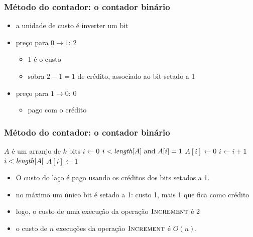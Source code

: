 \documentclass{beamer}
\begin{document}
\begin{frame}

\frametitle{Método do contador: o contador binário}

\begin{itemize}

  \item a unidade de custo é inverter um bit

  \item preço para $0 \rightarrow 1$: 2
   
  \begin{itemize}

    \item 1 é o custo

    \item sobra $2 - 1 = 1$ de crédito, associado ao bit setado a 1

  \end{itemize}

  \item preço para $1 \rightarrow 0$: 0

    \begin{itemize}

      \item pago com o crédito

    \end{itemize}
  
\end{itemize}

\end{frame}

\begin{frame}

\frametitle{Método do contador: o contador binário}

  \begin{codebox}
    \zi \Comment $A$ é um arranjo de $k$ bits
    \li $i \gets 0$
    \li \While $i < \id{length}[A] \mbox{ and } A[i] = 1$
    \li \Do $A[i] \gets 0$
    \li   $i \gets i + 1$
        \End
    \li \If $i < \id{length}[A]$
    \li \Then $A[i] \gets 1$
        \End
  \end{codebox}

\begin{itemize}
\item O custo do laço é pago usando os créditos dos bits setados a 1.

\item no máximo um único bit é setado a 1: custo 1, mais 1 que fica como crédito

\item logo, o custo de uma execução da operação $\textnormal{\scshape Increment}$ é 2

\item o custo de $n$ execuções da operação $\textnormal{\scshape Increment}$ é $O(n)$.

\end{itemize}

\end{frame}
\end{document}
